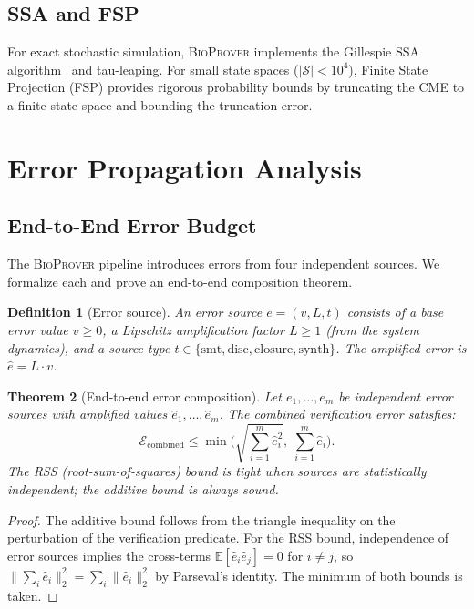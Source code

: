 \documentclass[11pt]{article}
\newtheorem{theorem}{Theorem}
\newtheorem{definition}[theorem]{Definition}
\newcommand{\bioprover}{\textsc{BioProver}}
\begin{document}
\subsection{SSA and FSP}

For exact stochastic simulation, \bioprover{} implements the
Gillespie SSA algorithm~\cite{gillespie1977exact} and tau-leaping.
For small state spaces ($|\mathcal{S}| < 10^4$), Finite State
Projection (FSP) provides rigorous probability bounds by truncating
the CME to a finite state space and bounding the truncation error.

\section{Error Propagation Analysis}
\label{app:error}

\subsection{End-to-End Error Budget}

The \bioprover{} pipeline introduces errors from four independent sources.
We formalize each and prove an end-to-end composition theorem.

\begin{definition}[Error source]
An error source $e = (v, L, t)$ consists of a base error value $v \geq 0$,
a Lipschitz amplification factor $L \geq 1$ (from the system dynamics),
and a source type $t \in \{\text{smt}, \text{disc}, \text{closure}, \text{synth}\}$.
The \emph{amplified error} is $\hat{e} = L \cdot v$.
\end{definition}

\begin{theorem}[End-to-end error composition]
\label{thm:error-compose}
Let $e_1, \ldots, e_m$ be independent error sources with amplified
values $\hat{e}_1, \ldots, \hat{e}_m$. The combined verification
error satisfies:
\begin{equation}
\mathcal{E}_{\text{combined}} \leq \min\!\Big(
  \sqrt{\sum_{i=1}^m \hat{e}_i^2},\;
  \sum_{i=1}^m \hat{e}_i
\Big).
\end{equation}
The RSS (root-sum-of-squares) bound is tight when sources are
statistically independent; the additive bound is always sound.
\end{theorem}

\begin{proof}
The additive bound follows from the triangle inequality on the
perturbation of the verification predicate. For the RSS bound,
independence of error sources implies the cross-terms
$\mathbb{E}[\hat{e}_i \hat{e}_j] = 0$ for $i \neq j$, so
$\|\sum_i \hat{e}_i\|_2^2 = \sum_i \|\hat{e}_i\|_2^2$
by Parseval's identity. The minimum of both bounds is taken.
\end{proof}
\end{document}

